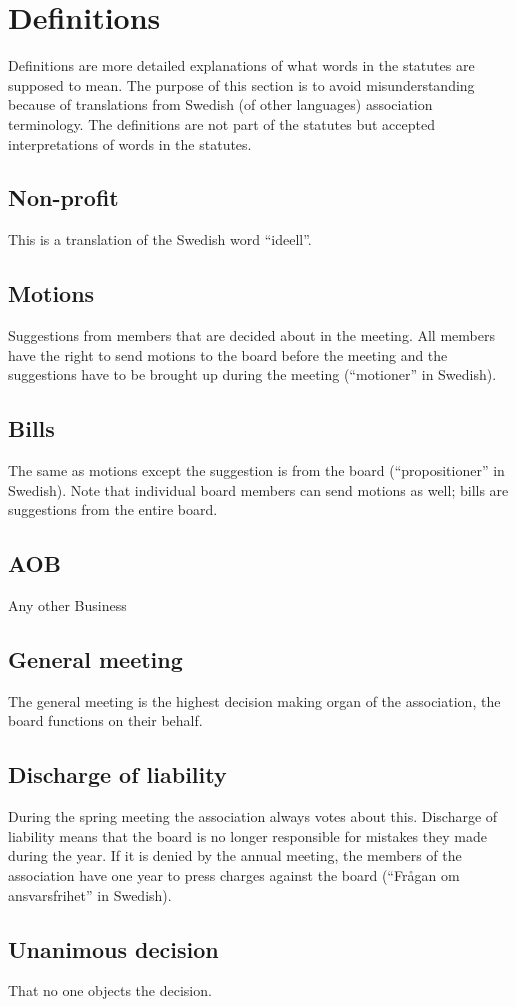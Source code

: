 \section*{Definitions}

Definitions are more detailed explanations of what words in the statutes are supposed to mean. The purpose of this section is to avoid misunderstanding because of translations from Swedish (of other languages) association terminology. The definitions are not part of the statutes but accepted interpretations of words in the statutes. 

\subsection*{Non-profit}
This is a translation of the Swedish word “ideell”.

\subsection*{Motions}
Suggestions from members that are decided about in the meeting. All members have the right to send motions to the board before the meeting and the suggestions have to be brought up during the meeting (“motioner” in Swedish). 

\subsection*{Bills}
The same as motions except the suggestion is from the board (“propositioner” in Swedish). Note that individual board members can send motions as well; bills are suggestions from the entire board.

\subsection*{AOB}
Any other Business 

\subsection*{General meeting}
The general meeting is the highest decision making organ of the association, the board functions on their behalf. 

\subsection*{Discharge of liability}
During the spring meeting the association always votes about this. Discharge of liability means that the board is no longer responsible for mistakes they made during the year. If it is denied by the annual meeting, the members of the association have one year to press charges against the board (“Frågan om ansvarsfrihet” in Swedish).

\subsection*{Unanimous decision}
That no one objects the decision.